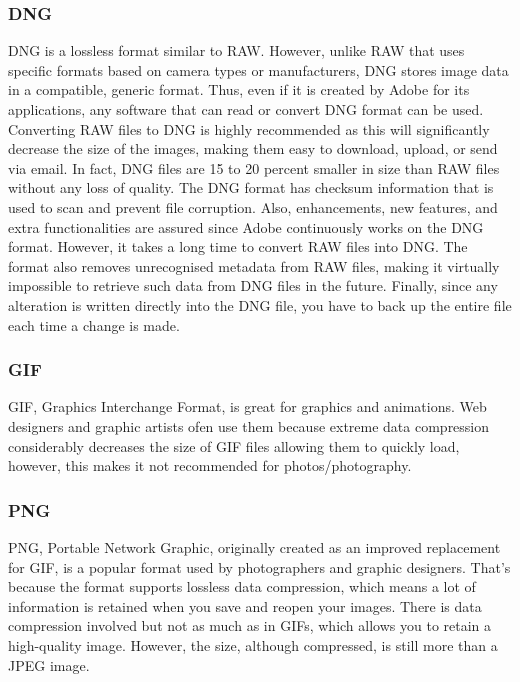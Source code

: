 \subsubsection{DNG}
DNG is a lossless format similar to RAW. However, unlike RAW that uses specific formats based on camera types or manufacturers, DNG stores image data in a compatible, generic format. Thus, even if it is created by Adobe for its applications, any software that can read or convert DNG format can be used.
\nl
Converting RAW files to DNG is highly recommended as this will significantly decrease the size of the images, making them easy to download, upload, or send via email. In fact, DNG files are 15 to 20 percent smaller in size than RAW files without any loss of quality.
\nl
The DNG format has checksum information that is used to scan and prevent file corruption. Also, enhancements, new features, and extra functionalities are assured since Adobe continuously works on the DNG format.
\nl
However, it takes a long time to convert RAW files into DNG. The format also removes unrecognised metadata from RAW files, making it virtually impossible to retrieve such data from DNG files in the future. Finally, since any alteration is written directly into the DNG file, you have to back up the entire file each time a change is made.

\subsubsection{GIF}
GIF, Graphics Interchange Format, is great for graphics and animations. Web designers and graphic artists ofen use them because extreme data compression considerably decreases the size of GIF files allowing them to quickly load, however, this makes it not recommended for photos/photography.

\subsubsection{PNG}
PNG, Portable Network Graphic, originally created as an improved replacement for GIF, is a popular format used by photographers and graphic designers. That's because the format supports lossless data compression, which means a lot of information is retained when you save and reopen your images.
\nl 
There is data compression involved but not as much as in GIFs, which allows you to retain a high-quality image. However, the size, although compressed, is still more than a JPEG image.

